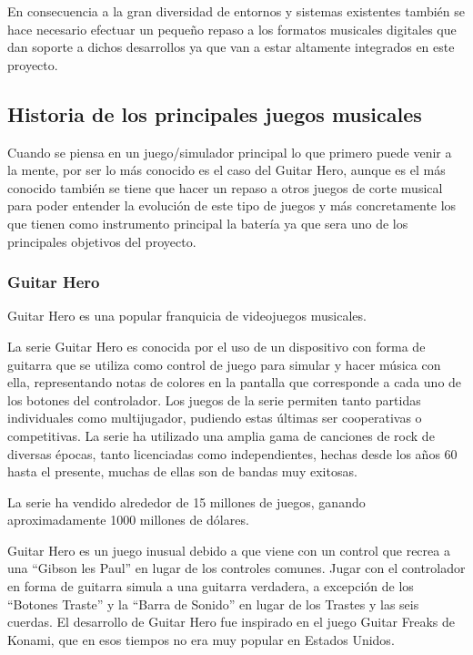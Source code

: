 \documentclass[a4paper,11pt,oneside]{book}
\begin{document}
  En consecuencia a la gran diversidad de entornos y sistemas existentes también se hace necesario efectuar un pequeño repaso a los formatos musicales digitales que dan soporte a dichos desarrollos ya que van a estar altamente integrados en este proyecto.
  
\subsection{Historia de los principales juegos musicales}
	Cuando se piensa en un juego/simulador principal lo que primero puede venir a la mente, por ser lo más conocido es el caso del \Gls{Guitar Hero}, aunque es el más conocido también se tiene que hacer un repaso a otros juegos de corte musical para poder entender la evolución de este tipo de juegos y más concretamente los que tienen como instrumento principal la batería ya que sera uno de los principales objetivos del proyecto.

\subsubsection{Guitar Hero}
\gls{Guitar Hero} es una popular franquicia de videojuegos musicales.

La serie \gls{Guitar Hero} es conocida por el uso de un dispositivo con forma de guitarra que se utiliza como control de juego para simular y hacer música con ella, representando notas de colores en la pantalla que corresponde a cada uno de los botones del controlador. Los juegos de la serie permiten tanto partidas individuales como multijugador, pudiendo estas últimas ser cooperativas o competitivas. La serie ha utilizado una amplia gama de canciones de rock de diversas épocas, tanto licenciadas como independientes, hechas desde los años 60 hasta el presente, muchas de ellas son de bandas muy exitosas.

La serie ha vendido alrededor de 15 millones de juegos, ganando aproximadamente 1000 millones de dólares.



\gls{Guitar Hero} es un juego inusual debido a que viene con un control que recrea a una ``Gibson les Paul'' en lugar de los controles comunes. Jugar con el controlador en forma de guitarra simula a una guitarra verdadera, a excepción de los ``Botones Traste'' y la ``Barra de Sonido'' en lugar de los Trastes y las seis cuerdas. El desarrollo de Guitar Hero fue inspirado en el juego Guitar Freaks de Konami, que en esos tiempos no era muy popular en Estados Unidos.
\end{document}
